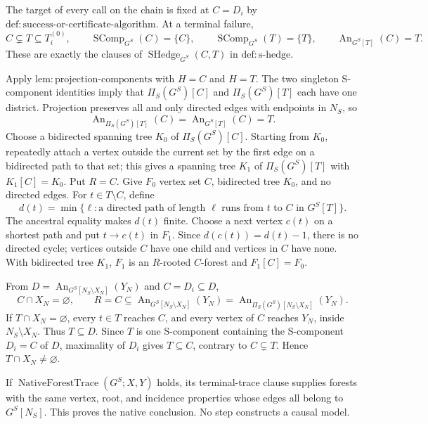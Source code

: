 The target of every call on the chain is fixed at \(C=D_i\) by \(\mathrm{def:success\text{-}or\text{-}certificate\text{-}algorithm}\). At a terminal failure,
\[
 C\subsetneq T\subseteq T_i^{(0)},\qquad
 \operatorname{SComp}_{G^S}(C)=\{C\},\qquad
 \operatorname{SComp}_{G^S}(T)=\{T\},\qquad
 \operatorname{An}_{G^S[T]}(C)=T.
\]
These are exactly the clauses of \(\operatorname{SHedge}_{G^S}(C,T)\) in \(\mathrm{def:s\text{-}hedge}\).

Apply \(\mathrm{lem:projection\text{-}components}\) with \(H=C\) and \(H=T\). The two singleton S-component identities imply that \(\Pi_S(G^S)[C]\) and \(\Pi_S(G^S)[T]\) each have one district. Projection preserves all and only directed edges with endpoints in \(N_S\), so
\[
 \operatorname{An}_{\Pi_S(G^S)[T]}(C)
 =\operatorname{An}_{G^S[T]}(C)=T.
\]
Choose a bidirected spanning tree \(K_0\) of \(\Pi_S(G^S)[C]\). Starting from \(K_0\), repeatedly attach a vertex outside the current set by the first edge on a bidirected path to that set; this gives a spanning tree \(K_1\) of \(\Pi_S(G^S)[T]\) with \(K_1[C]=K_0\). Put \(R=C\). Give \(F_0\) vertex set \(C\), bidirected tree \(K_0\), and no directed edges. For \(t\in T\setminus C\), define
\[
 d(t)=\min\{\ell:\text{a directed path of length }\ell
 \text{ runs from }t\text{ to }C\text{ in }G^S[T]\}.
\]
The ancestral equality makes \(d(t)\) finite. Choose a next vertex \(c(t)\) on a shortest path and put \(t\to c(t)\) in \(F_1\). Since \(d(c(t))=d(t)-1\), there is no directed cycle; vertices outside \(C\) have one child and vertices in \(C\) have none. With bidirected tree \(K_1\), \(F_1\) is an \(R\)-rooted \(C\)-forest and \(F_1[C]=F_0\).

From \(D=\operatorname{An}_{G^S[N_S\setminus X_N]}(Y_N)\) and \(C=D_i\subseteq D\),
\[
 C\cap X_N=\varnothing,\qquad
 R=C\subseteq\operatorname{An}_{G^S[N_S\setminus X_N]}(Y_N)
 =\operatorname{An}_{\Pi_S(G^S)[N_S\setminus X_N]}(Y_N).
\]
If \(T\cap X_N=\varnothing\), every \(t\in T\) reaches \(C\), and every vertex of \(C\) reaches \(Y_N\), inside \(N_S\setminus X_N\). Thus \(T\subseteq D\). Since \(T\) is one S-component containing the S-component \(D_i=C\) of \(D\), maximality of \(D_i\) gives \(T\subseteq C\), contrary to \(C\subsetneq T\). Hence \(T\cap X_N\ne\varnothing\).

If \(\operatorname{NativeForestTrace}(G^S;X,Y)\) holds, its terminal-trace clause supplies forests with the same vertex, root, and incidence properties whose edges all belong to \(G^S[N_S]\). This proves the native conclusion. No step constructs a causal model.